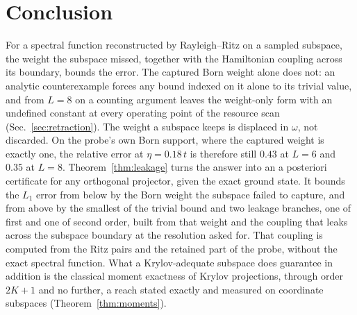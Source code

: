%
%
%
%
%
%
%
%
%
%
%
%
%
%

\section{Conclusion}
\label{sec:conclusion}

For a spectral function reconstructed by Rayleigh--Ritz on a sampled subspace, the weight the
subspace missed, together with the Hamiltonian coupling across its boundary, bounds the error. The
captured Born weight alone does not: an analytic counterexample forces any bound indexed on it alone
to its trivial value, and from $L=8$ on a counting argument leaves the weight-only form with an
undefined constant at every operating point of the resource scan (Sec.~\ref{sec:retraction}). The weight a subspace keeps is displaced in $\omega$, not
discarded. On the probe's own Born support, where the captured weight is exactly one, the relative
error at $\eta=0.18\,t$ is therefore still $0.43$ at $L=6$ and $0.35$ at $L=8$.
Theorem~\ref{thm:leakage} turns the answer into an a posteriori certificate for any orthogonal
projector, given the exact ground state. It bounds the $L_1$ error from below by the Born weight the
subspace failed to capture, and from above by the smallest of the trivial bound and two leakage branches,
one of first and one of second order,
built from that weight and the coupling that leaks across the subspace boundary at the resolution
asked for. That coupling is computed from the Ritz pairs and the retained part of the probe, without
the exact spectral function. What a Krylov-adequate subspace
does guarantee in addition is the classical moment exactness of Krylov projections, through order
$2K+1$ and no further, a reach stated exactly and measured on coordinate subspaces
(Theorem~\ref{thm:moments}).

